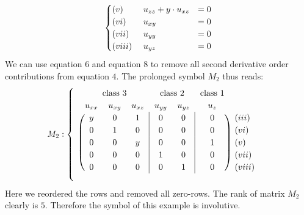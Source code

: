 \begin{example}
\begin{align}
\begin{cases}
                        (v)\hphantom{iii} \ \ \ \  u_{zz} + y \cdot u_{xz} &= 0 \\
                        (vi)\hphantom{ii} \ \ \ \ u_{xy} &= 0 \\
                        (vii)\hphantom{i} \ \ \ \ u_{yy} &= 0 \\
                        (viii) \ \ \ \ u_{yz} &= 0 
            \end{cases}
\end{align}
We can use equation $6$ and equation $8$ to remove all second derivative order contributions from equation $4$.
The prolonged symbol $M_2$ thus reads:
\begin{align}
M_2 : \begin{cases}
\ \ 
\begin{blockarray}{ccccccc}
\BAmulticolumn{3}{c}{\text{class 3}} & 
\BAmulticolumn{2}{c}{\text{class 2}} & 
\text{class 1} \\
u_{xx} & u_{xy} & u_{xz} & u_{yy} & u_{yz} & u_{z} \\
\begin{block}{(ccc|cc|c)l}
  y & 0 & 1 & 0 & 0 & 0 & (iii) \\
  0 & 1 & 0 & 0 & 0 & 0 & (vi) \\
  0 & 0 & y & 0 & 0 & 1 & (v) \\
  0 & 0 & 0 & 1 & 0 & 0 & (vii) \\
  0 & 0 & 0 & 0 & 1 & 0 & (viii) \\
\end{block}
\end{blockarray}
\end{cases}
\end{align}
Here we reordered the rows and removed all zero-rows. The rank of matrix $M_2$ clearly is $5$. Therefore the symbol of this example is involutive.
\end{example}

